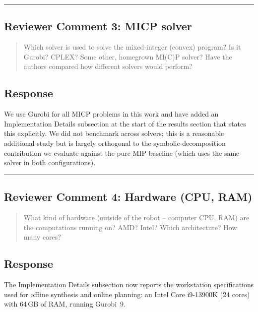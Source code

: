 \noindent\rule{17cm}{2.0pt}

\subsection{Reviewer Comment 3: MICP solver}
\begin{mdframed}
\begin{quote}
Which solver is used to solve the mixed-integer (convex) program? Is it Gurobi? CPLEX? Some other, homegrown MI(C)P solver? Have the authors compared how different solvers would perform?
\end{quote}
\end{mdframed}

\subsection{Response}
We use Gurobi for all MICP problems in this work and have added an Implementation Details subsection at the start of the results section that states this explicitly. We did not benchmark across solvers; this is a reasonable additional study but is largely orthogonal to the symbolic-decomposition contribution we evaluate against the pure-MIP baseline (which uses the same solver in both configurations).

\textit{}

\noindent\rule{17cm}{2.0pt}

\subsection{Reviewer Comment 4: Hardware (CPU, RAM)}
\begin{mdframed}
\begin{quote}
What kind of hardware (outside of the robot -- computer CPU, RAM) are the computations running on? AMD? Intel? Which architecture? How many cores?
\end{quote}
\end{mdframed}

\subsection{Response}
The Implementation Details subsection now reports the workstation specifications used for offline synthesis and online planning: an Intel Core i9-13900K (24 cores) with 64\,GB of RAM, running Gurobi~9.

